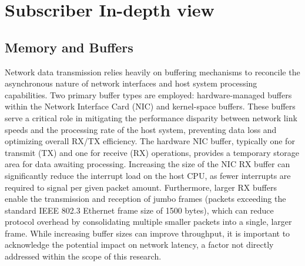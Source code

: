 \section{Subscriber In-depth view}
\subsection{Memory and Buffers}




Network data transmission relies heavily on buffering mechanisms to reconcile the asynchronous nature of network interfaces and host system processing capabilities. Two primary buffer types are employed: hardware-managed buffers within the Network Interface Card (NIC) and kernel-space buffers. These buffers serve a critical role in mitigating the performance disparity between network link speeds and the processing rate of the host system, preventing data loss and optimizing overall RX/TX efficiency. The hardware NIC buffer, typically one for transmit (TX) and one for receive (RX) operations, provides a temporary storage area for data awaiting processing. Increasing the size of the NIC RX buffer can significantly reduce the interrupt load on the host CPU, as fewer interrupts are required to signal per given packet amount. Furthermore, larger RX buffers enable the transmission and reception of jumbo frames (packets exceeding the standard IEEE 802.3 Ethernet frame size of 1500 bytes), which can reduce protocol overhead by consolidating multiple smaller packets into a single, larger frame. While increasing buffer sizes can improve throughput, it is important to acknowledge the potential impact on network latency, a factor not directly addressed within the scope of this research.

